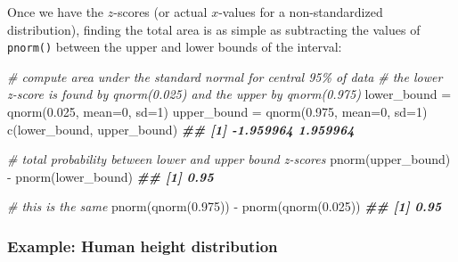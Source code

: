 \documentclass[
]{article}
\newenvironment{Shaded}{\begin{snugshade}}{\end{snugshade}}
\newcommand{\AttributeTok}[1]{\textcolor[rgb]{0.77,0.63,0.00}{#1}}
\newcommand{\CommentTok}[1]{\textcolor[rgb]{0.56,0.35,0.01}{\textit{#1}}}
\newcommand{\DecValTok}[1]{\textcolor[rgb]{0.00,0.00,0.81}{#1}}
\newcommand{\DocumentationTok}[1]{\textcolor[rgb]{0.56,0.35,0.01}{\textbf{\textit{#1}}}}
\newcommand{\FloatTok}[1]{\textcolor[rgb]{0.00,0.00,0.81}{#1}}
\newcommand{\FunctionTok}[1]{\textcolor[rgb]{0.00,0.00,0.00}{#1}}
\newcommand{\NormalTok}[1]{#1}
\newcommand{\OtherTok}[1]{\textcolor[rgb]{0.56,0.35,0.01}{#1}}
\newcommand{\SpecialCharTok}[1]{\textcolor[rgb]{0.00,0.00,0.00}{#1}}
\begin{document}
Once we have the \(z\)-scores (or actual \(x\)-values for a
non-standardized distribution), finding the total area is as simple as
subtracting the values of \texttt{pnorm()} between the upper and lower
bounds of the interval:

\begin{Shaded}
\begin{Highlighting}[]
\CommentTok{\# compute area under the standard normal for central 95\% of data}
\CommentTok{\# the lower z{-}score is found by qnorm(0.025) and the upper by qnorm(0.975)}
\NormalTok{lower\_bound }\OtherTok{=} \FunctionTok{qnorm}\NormalTok{(}\FloatTok{0.025}\NormalTok{, }\AttributeTok{mean=}\DecValTok{0}\NormalTok{, }\AttributeTok{sd=}\DecValTok{1}\NormalTok{)}
\NormalTok{upper\_bound }\OtherTok{=} \FunctionTok{qnorm}\NormalTok{(}\FloatTok{0.975}\NormalTok{, }\AttributeTok{mean=}\DecValTok{0}\NormalTok{, }\AttributeTok{sd=}\DecValTok{1}\NormalTok{)}
\FunctionTok{c}\NormalTok{(lower\_bound, upper\_bound)}
\DocumentationTok{\#\# [1] {-}1.959964  1.959964}
\end{Highlighting}
\end{Shaded}

\begin{Shaded}
\begin{Highlighting}[]

\CommentTok{\# total probability between lower and upper bound z{-}scores}
\FunctionTok{pnorm}\NormalTok{(upper\_bound) }\SpecialCharTok{{-}} \FunctionTok{pnorm}\NormalTok{(lower\_bound)}
\DocumentationTok{\#\# [1] 0.95}
\end{Highlighting}
\end{Shaded}

\begin{Shaded}
\begin{Highlighting}[]

\CommentTok{\# this is the same}
\FunctionTok{pnorm}\NormalTok{(}\FunctionTok{qnorm}\NormalTok{(}\FloatTok{0.975}\NormalTok{)) }\SpecialCharTok{{-}} \FunctionTok{pnorm}\NormalTok{(}\FunctionTok{qnorm}\NormalTok{(}\FloatTok{0.025}\NormalTok{))}
\DocumentationTok{\#\# [1] 0.95}
\end{Highlighting}
\end{Shaded}

\hypertarget{example-human-height-distribution}{%
\subsubsection{Example: Human height
distribution}\label{example-human-height-distribution}}
\end{document}
